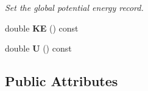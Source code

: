\begin{DoxyCompactItemize}
\begin{DoxyCompactList}\small\item\em Set the global potential energy record. \end{DoxyCompactList}\item 
\hypertarget{classSystem_aa71800b13f35268a6a288cd5153fe07b}{double {\bfseries K\-E} () const }\label{classSystem_aa71800b13f35268a6a288cd5153fe07b}

\item 
\hypertarget{classSystem_a25faf43e5d30464a88b2ca7fa3d1be59}{double {\bfseries U} () const }\label{classSystem_a25faf43e5d30464a88b2ca7fa3d1be59}

\end{DoxyCompactItemize}
\subsection*{Public Attributes}
